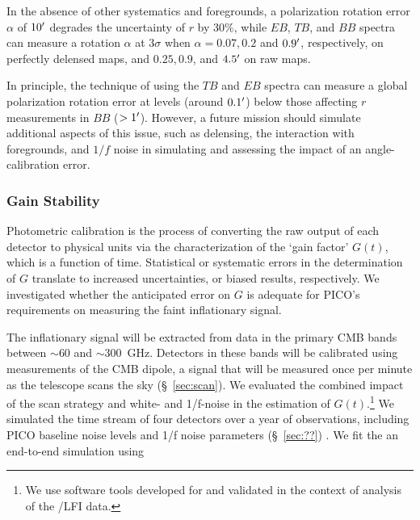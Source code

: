 \documentclass[PICOReport.tex]{subfiles}
\begin{document}

In the absence of other systematics and foregrounds, a polarization rotation error $\alpha$ of $10'$ degrades 
the uncertainty of $r$ by 30\%, while $EB$, $TB$, and $BB$ spectra can measure a rotation $\alpha$ at 3$\sigma$ when $\alpha = 0.07, 0.2$  and $0.9'$, respectively,
 on perfectly delensed maps, and $0.25, 0.9$, and $4.5'$ on raw maps.

In principle, the technique of using the $TB$ and $EB$ spectra can measure a global polarization rotation error at levels (around $0.1 '$) below those affecting $r$ measurements in $BB$ ($> 1 '$).  However, a future mission should simulate additional aspects of this issue, such as delensing, the interaction with foregrounds, and $1/f$ noise in simulating and assessing the impact of an angle-calibration error.

\subsubsection{Gain Stability}
\label{sec:gain}

Photometric calibration is the process of converting the raw output of each detector to physical units via the characterization of the `gain factor' $G(t)$, which is a function of time. Statistical or systematic errors in the determination of $G$ translate to increased uncertainties, or biased results, respectively.  We investigated whether the anticipated error on $G$ is adequate for PICO's requirements on measuring the faint inflationary signal.  

The inflationary signal will be extracted from data in the primary CMB bands between $\sim$60 and $\sim$300~GHz. Detectors in these bands will be calibrated using measurements of the CMB dipole, a signal that will be measured once per minute as the telescope scans the sky (\S~\ref{sec:scan}).  We evaluated the combined impact of the scan strategy and white- and 1/f-noise in the estimation of $G(t)$.\footnote{We use software tools developed for and validated in the context of analysis of the \planck/LFI data.} We simulated the time stream of four detectors over a year of observations, including PICO baseline noise levels and 1/f noise parameters (\S~\ref{sec:??}) . We fit the  an end-to-end simulation using
\end{document}
